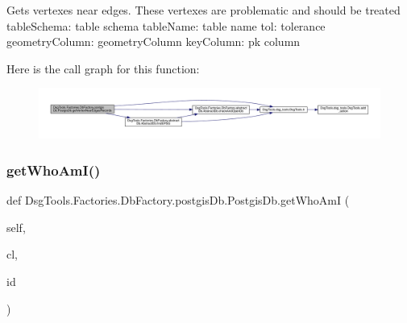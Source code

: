 \begin{DoxyVerb}Gets vertexes near edges. These vertexes are problematic and should be treated
tableSchema: table schema
tableName: table name
tol: tolerance
geometryColumn: geometryColumn
keyColumn: pk column
\end{DoxyVerb}
 Here is the call graph for this function\+:
\nopagebreak
\begin{figure}[H]
\begin{center}
\leavevmode
\includegraphics[width=350pt]{class_dsg_tools_1_1_factories_1_1_db_factory_1_1postgis_db_1_1_postgis_db_a3dd2b256b38a8a296ba5df4ab7f60395_cgraph}
\end{center}
\end{figure}
\mbox{\label{class_dsg_tools_1_1_factories_1_1_db_factory_1_1postgis_db_1_1_postgis_db_a546fb6eb3f9d26674836af52c1e7d0b8}} 
\subsubsection{\texorpdfstring{get\+Who\+Am\+I()}{getWhoAmI()}}
{\footnotesize\ttfamily def Dsg\+Tools.\+Factories.\+Db\+Factory.\+postgis\+Db.\+Postgis\+Db.\+get\+Who\+AmI (\begin{DoxyParamCaption}\item[{}]{self,  }\item[{}]{cl,  }\item[{}]{id }\end{DoxyParamCaption})}

